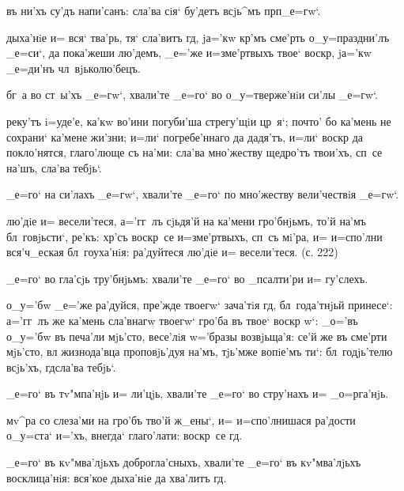 
  въ ни'хъ су'дъ напи'санъ: 
сла'ва сiя` бу'детъ всjь^мъ прп _е=гw`.

 дыха'нiе и= вся` тва'рь, тя` сла'витъ 
гд, jа='кw кр'мъ сме'рть о_у=праздни'лъ _е=си`, да 
пока'жеши лю'демъ, _е='же и=з\ъ ме'ртвыхъ твое` 
воскр, jа='кw _е=ди'нъ чл~вjьколю'бецъ.

  бг~а во ст~ы'хъ _е=гw`, хвали'те 
_е=го` во о_у=тверже'нiи си'лы _е=гw`.

 реку'тъ i=уде'е, ка'кw во'ини погуби'ша 
стрегу'щiи цр~я`; почто' бо ка'мень не сохрани` ка'мене 
жи'зни; и=ли` погребе'ннаго да дадя'тъ, и=ли` воскр 
да покло'нятся, глаго'люще съ на'ми: сла'ва мно'жеству 
щедро'тъ твои'хъ, сп~се на'шъ, сла'ва тебjь`. 

  _е=го` на си'лахъ _е=гw`, 
хвали'те _е=го` по мно'жеству вели'чествiя _е=гw`.

 лю'дiе и= весели'теся, а='гг~лъ сjьдя'й 
на ка'мени гро'бнjьмъ, то'й на'мъ бл~говjьсти`, ре'къ: 
хр'съ воскр~се и=з\ъ ме'ртвыхъ, сп~съ мi'ра, и= 
и=спо'лни вся'ч_еская бл~гоуха'нiя: ра'дуйтеся лю'дiе и= 
весели'теся. (с. 222)

  _е=го` во гла'сjь тру'бнjьмъ: 
хвали'те _е=го` во _псалти'ри и= гу'слехъ.

 о_у='бw _е='же ра'дуйся, пре'жде твоегw` 
зача'тiя гд, бл~года'тнjьй принесе`: а='гг~лъ же 
ка'мень сла'внагw твоегw` гро'ба въ твое` воскр 
w`: _о='въ о_у='бw въ печа'ли мjь'сто, весе'лiя 
w='бразы возвjьща'я: се'й же въ сме'рти мjь'сто, вл 
жизнода'вца проповjь'дуя на'мъ, тjь'мже вопiе'мъ ти`: 
бл~годjь'телю всjь'хъ, гд сла'ва тебjь`.


  _е=го` въ тv"мпа'нjь и= ли'цjь, 
хвали'те _е=го` во стру'нахъ и= _о=рга'нjь.

 мv^ра со слеза'ми на гро'бъ тво'й 
ж_ены`, и= и=спо'лнишася ра'дости о_у=ста` и='хъ, внегда` 
глаго'лати: воскр~се гд.

  _е=го` въ кv"мва'лjьхъ 
доброгла'сныхъ, хвали'те _е=го` въ кv"мва'лjьхъ 
восклица'нiя: вся'кое дыха'нiе да хва'литъ гд.

